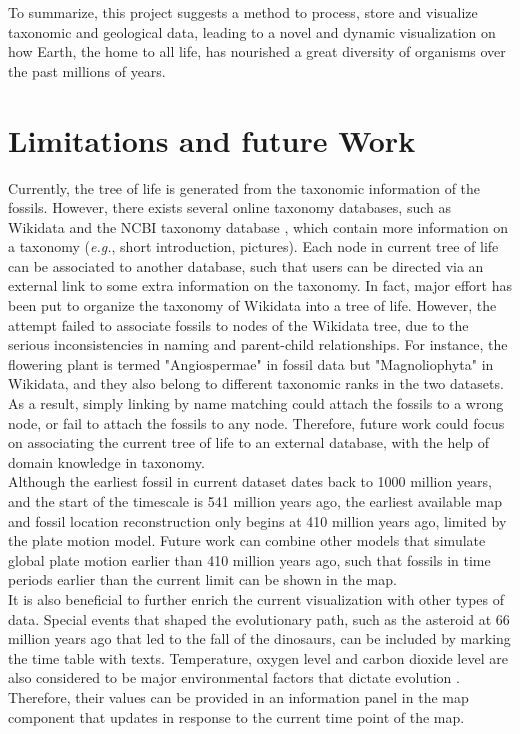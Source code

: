 \documentclass[11pt, a4paper,oneside,chapterprefix=false]{scrbook}
\begin{document}
To summarize, this project suggests a method to process, store and visualize taxonomic and geological data, leading to a novel and dynamic visualization on how Earth, the home to all life, has nourished a great diversity of organisms over the past millions of years.

\section{Limitations and future Work}
Currently, the tree of life is generated from the taxonomic information of the fossils. However, there exists several online taxonomy databases, such as Wikidata \cite{vrandevcic2014wikidata} and the NCBI taxonomy database \cite{federhen2012ncbi}, which contain more information on a taxonomy (\emph{e.g.}, short introduction, pictures). Each node in current tree of life can be associated to another database, such that users can be directed via an external link to some extra information on the taxonomy. In fact, major effort has been put to organize the taxonomy of Wikidata into a tree of life. However, the attempt failed to associate fossils to nodes of the Wikidata tree, due to the serious inconsistencies in naming and parent-child relationships. For instance, the flowering plant is termed "Angiospermae" in fossil data but "Magnoliophyta" in Wikidata, and they also belong to different taxonomic ranks in the two datasets. As a result, simply linking by name matching could attach the fossils to a wrong node, or fail to attach the fossils to any node. Therefore, future work could focus on associating the current tree of life to an external database, with the help of domain knowledge in taxonomy.\\

Although the earliest fossil in current dataset dates back to 1000 million years, and the start of the timescale is 541 million years ago, the earliest available map and fossil location reconstruction only begins at 410 million years ago, limited by the plate motion model. Future work can combine other models that simulate global plate motion earlier than 410 million years ago, such that fossils in time periods earlier than the current limit can be shown in the map. \\

It is also beneficial to further enrich the current visualization with other types of data. Special events that shaped the evolutionary path, such as the asteroid at 66 million years ago that led to the fall of the dinosaurs, can be included by marking the time table with texts. Temperature, oxygen level and carbon dioxide level are also considered to be major environmental factors that dictate evolution \cite{butterfield2009oxygen, svenning2007ice}. Therefore, their values can be provided in an information panel in the map component that updates in response to the current time point of the map. 
\end{document}
